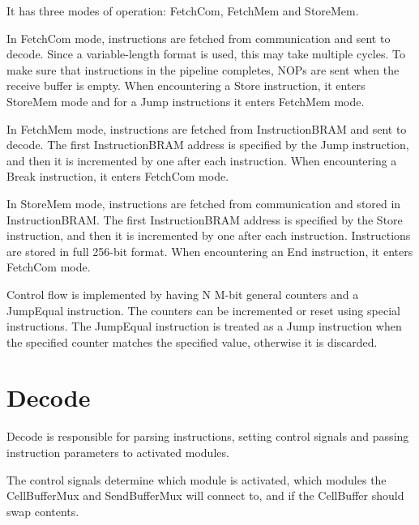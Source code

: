 It has three modes of operation: FetchCom, FetchMem and StoreMem.

In FetchCom mode, instructions are fetched from communication and sent to decode.
Since a variable-length format is used, this may take multiple cycles.
To make sure that instructions in the pipeline completes, NOPs are sent when the receive buffer is empty.
When encountering a Store instruction, it enters StoreMem mode and for a Jump instructions it enters FetchMem mode.

In FetchMem mode, instructions are fetched from InstructionBRAM and sent to decode.
The first InstructionBRAM address is specified by the Jump instruction, and then it is incremented by one after each instruction.
When encountering a Break instruction, it enters FetchCom mode.

In StoreMem mode, instructions are fetched from communication and stored in InstructionBRAM.
The first InstructionBRAM address is specified by the Store instruction, and then it is incremented by one after each instruction.
Instructions are stored in full 256-bit format.
When encountering an End instruction, it enters FetchCom mode.

Control flow is implemented by having N M-bit general counters and a JumpEqual instruction.
The counters can be incremented or reset using special instructions.
The JumpEqual instruction is treated as a Jump instruction when the specified counter matches the specified value, otherwise it is discarded.

\section{Decode}

Decode is responsible for parsing instructions, setting control signals and passing instruction parameters to activated modules.

The control signals determine which module is activated, which modules the CellBufferMux and SendBufferMux will connect to, and if the CellBuffer should swap contents.





